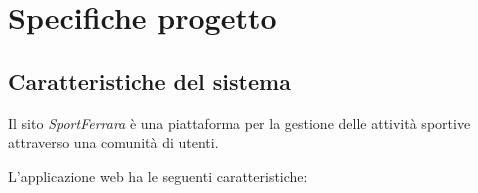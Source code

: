 
\chapter{Specifiche progetto}
\label{cap:specifiche-progetto}

\section{Caratteristiche del sistema}
Il sito \emph{SportFerrara} è una piattaforma per la gestione delle attività sportive attraverso una comunità di utenti.

L'applicazione web ha le seguenti caratteristiche:


